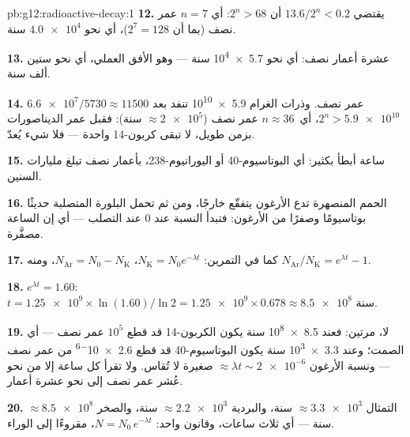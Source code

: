 \begin{solution}{pb:g12:radioactive-decay:1}
\textbf{12.} يقتضي $13.6/2^n < 0.2$ أن $2^n > 68$: أي $n = 7$ عمر نصف
(بما أن $2^7 = 128$)، أي نحو $\num{4.0e4}$ سنة.

\textbf{13.} عشرة أعمار نصف: أي نحو \num{5.7e4} سنة ---
وهو الأفق العملي، أي نحو ستين ألف سنة.

\textbf{14.} $\num{6.6e7}/\num{5730} \approx \num{11500}$ عمر نصف.
وذرات الغرام \num{5.9e10} تنفد بعد
$2^n > \num{5.9e10}$، أي\ $n \approx 36$ عمر نصف
($\approx \num{2e5}$ سنة): فقبل عمر الديناصورات بزمن طويل، لا تبقى 
كربون-14 واحدة --- فلا شيء يُعدّ.

\textbf{15.} ساعة أبطأ بكثير: أي البوتاسيوم-40 أو اليورانيوم-238،
بأعمار نصف تبلغ مليارات السنين.

\textbf{16.} الحمم المنصهرة تدع الأرغون يتفقّع خارجًا، ومن ثم تحمل البلورة
المتصلبة حديثًا بوتاسيومًا وصفرًا من الأرغون: فتبدأ النسبة
عند $0$ عند التصلب --- أي إن الساعة مصفَّرة.

\textbf{17.} كما في التمرين: $N_{\mathrm K} = N_0 e^{-\lambda t}$،
$N_{\mathrm{Ar}} = N_0 - N_{\mathrm K}$، ومنه
$N_{\mathrm{Ar}}/N_{\mathrm K} = e^{\lambda t} - 1$.

\textbf{18.} $e^{\lambda t} = 1.60$:
$t = \num{1.25e9} \times \ln(1.60)/\ln 2 = \num{1.25e9} \times 0.678
\approx \num{8.5e8}$ سنة.

\textbf{19.} لا، مرتين: فعند \num{8.5e8} سنة يكون الكربون-14 قد قطع
$10^5$ عمر نصف --- أي الصمت؛ وعند \num{3.3e3} سنة يكون البوتاسيوم-40 قد
قطع \num{2.6e-6} من عمر نصف --- ونسبة الأرغون
$\approx \lambda t \sim \num{2e-6}$ صغيرة لا تُقاس. ولا تقرأ كل
ساعة إلا من نحو عُشر عمر نصف إلى نحو عشرة أعمار.

\textbf{20.} التمثال $\approx \num{3.3e3}$ سنة، والبردية
$\approx \num{2.2e3}$ سنة، والصخر $\approx \num{8.5e8}$ سنة ---
أي ثلاث ساعات، وقانون واحد: $N = N_0\,e^{-\lambda t}$، مقروءًا إلى الوراء.
\end{solution}
